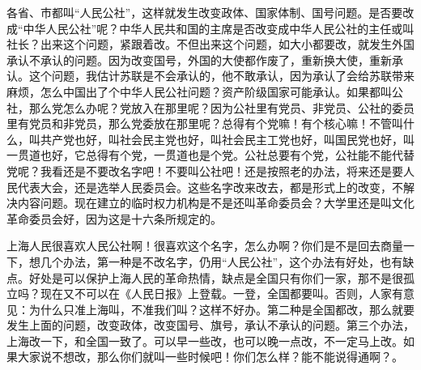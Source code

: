各省、市都叫“人民公社”，这样就发生改变政体、国家体制、国号问题。是否要改成“中华人民公社”呢？中华人民共和国的主席是否改变成中华人民公社的主任或叫社长？出来这个问题，紧跟着改。不但出来这个问题，如大小都要改，就发生外国承认不承认的问题。因为改变国号，外国的大使都作废了，重新换大使，重新承认。这个问题，我估计苏联是不会承认的，他不敢承认，因为承认了会给苏联带来麻烦，怎么中国出了个中华人民公社问题？资产阶级国家可能承认。如果都叫公社，那么党怎么办呢？党放入在那里呢？因为公社里有党员、非党员、公社的委员里有党员和非党员，那么党委放在那里呢？总得有个党嘛！有个核心嘛！不管叫什么，叫共产党也好，叫社会民主党也好，叫社会民主工党也好，叫国民党也好，叫一贯道也好，它总得有个党，一贯道也是个党。公社总要有个党，公社能不能代替党呢？我看还是不要改名字吧！不要叫公社吧！还是按照老的办法，将来还是要人民代表大会，还是选举人民委员会。这些名字改来改去，都是形式上的改变，不解决内容问题。现在建立的临时权力机构是不是还叫革命委员会？大学里还是叫文化革命委员会好，因为这是十六条所规定的。

上海人民很喜欢人民公社啊！很喜欢这个名字，怎么办啊？你们是不是回去商量一下，想几个办法，第一种是不改名字，仍用“人民公社”，这个办法有好处，也有缺点。好处是可以保护上海人民的革命热情，缺点是全国只有你们一家，那不是很孤立吗？现在又不可以在《人民日报》上登载。一登，全国都要叫。否则，人家有意见：为什么只准上海叫，不准我们叫？这样不好办。第二种是全国都改，那么就要发生上面的问题，改变政体，改变国号、旗号，承认不承认的问题。第三个办法，上海改一下，和全国一致了。可以早一些改，也可以晚一点改，不一定马上改。如果大家说不想改，那么你们就叫一些时候吧！你们怎么样？能不能说得通啊？。

